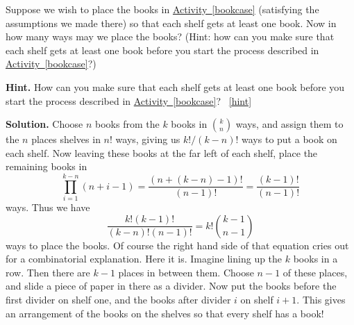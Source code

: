 \documentclass{book}
\begin{document}
\setcounter{project}{126}
\addtocounter{project}{-1}
\begin{activity}[]\label{bookcaseeveryshelf}
\hypertarget{p-896}{}%
Suppose we wish to place the books in \hyperref[bookcase]{Activity~\ref{bookcase}} (satisfying the assumptions we made there) so that each shelf gets at least one book. Now in how many ways may we place the books? (Hint: how can you make sure that each shelf gets at least one book before you start the process described in \hyperref[bookcase]{Activity~\ref{bookcase}}?)%
\par\smallskip%
\noindent\textbf{Hint.}\hypertarget{hint-84}{}\quad%
\hypertarget{p-897}{}%
How can you make sure that each shelf gets at least one book before you start the process described in \hyperref[bookcase]{Activity~\ref{bookcase}}?%
~\hfill{\tiny\hyperlink{a-126}{[hint]}\hypertarget{q-126}{}}\par\smallskip%
\noindent\textbf{Solution.}\hypertarget{solution-94}{}\quad%
\hypertarget{p-898}{}%
Choose \(n\) books from the \(k\) books in \(\binom{k}{n}\) ways, and assign them to the \(n\) places shelves in \(n!\) ways, giving us \(k!/(k-n)!\) ways to put a book on each shelf. Now leaving these books at the far left of each shelf, place the remaining books in%
\begin{equation*}
\prod_{i=1}^{k-n}
(n+i-1)=\frac{(n+(k-n)-1)!}{(n-1)!}=\frac{(k-1)!}{(n-1)!}
\end{equation*}
ways. Thus we have%
\begin{equation*}
\frac{k!(k-1)!}{(k-n)!(n-1)!}=k!\binom{k-1}{n-1}
\end{equation*}
ways to place the books. Of course the right hand side of that equation cries out for a combinatorial explanation. Here it is. Imagine lining up the \(k\) books in a row. Then there are \(k-1\) places in between them. Choose \(n-1\) of these places, and slide a piece of paper in there as a divider. Now put the books before the first divider on shelf one, and the books after divider \(i\) on shelf \(i+1\). This gives an arrangement of the books on the shelves so that every shelf has a book!%
\end{activity}
\end{document}
